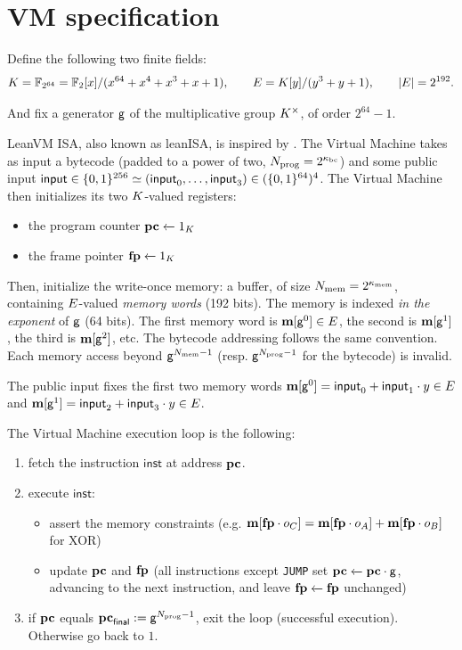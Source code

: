\section{VM specification}\label{sec:vm}

Define the following two finite fields:
\[
  K=\mathbb{F}_{2^{64}}=\mathbb{F}_2[x]/(x^{64}+x^4+x^3+x+1),
  \qquad
  E=K[y]/(y^3+y+1),
  \qquad |E|=2^{192}.
\]

And fix a generator $\mathsf{g}$ of the multiplicative group $K^{\times}$, of order $2^{64}-1$.

\vspace{5mm}

LeanVM ISA, also known as leanISA, is inspired by \cite{cairo}. The Virtual Machine takes as input a bytecode (padded to a power of two, $N_{\mathrm{prog}} = 2^{\kappa_{\mathrm{bc}}}$) and some public input $\textsf{input} \in \{0,1\}^{256} \simeq (\textsf{input}_0, \dots, \textsf{input}_3) \in (\{0,1\}^{64})^4$. The Virtual Machine then initializes its two $K$-valued registers:
\begin{itemize}
  \item the program counter $\mathbf{pc} \xleftarrow{} 1_K$
  \item the frame pointer $\mathbf{fp} \xleftarrow{} 1_K$
\end{itemize}

Then, initialize the write-once memory: a buffer, of size $N_{\mathrm{mem}} = 2^{\kappa_{\mathrm{mem}}}$, containing $E$-valued \textit{memory words} (192 bits). The memory is indexed \textit{in the exponent} of $\mathsf{g}$ (64 bits). The first memory word is $\mathbf{m}[\mathsf{g}^0] \in E$, the second is $\mathbf{m}[\mathsf{g}^1]$, the third is $\mathbf{m}[\mathsf{g}^2]$, etc. The bytecode addressing follows the same convention. Each memory access beyond $\mathsf{g}^{N_{\mathrm{mem}} - 1}$ (resp. $\mathsf{g}^{N_{\mathrm{prog}} - 1}$ for the bytecode) is invalid.

The public input fixes the first two memory words $\mathbf{m}[\mathsf{g}^0] = \textsf{input}_0 + \textsf{input}_1 \cdot y \in E$ and $\mathbf{m}[\mathsf{g}^1] = \textsf{input}_2 + \textsf{input}_3 \cdot y \in E$.

The Virtual Machine execution loop is the following:
\begin{enumerate}
  \item fetch the instruction $\mathsf{inst}$ at address $\mathbf{pc}$.
  \item execute $\mathsf{inst}$:
    \begin{itemize}
      \item assert the memory constraints (e.g. $\mathbf{m}[\mathbf{fp}\cdot o_C]=\mathbf{m}[\mathbf{fp}\cdot o_A]+\mathbf{m}[\mathbf{fp}\cdot o_B]$ for XOR)
      \item update $\mathbf{pc}$ and $\mathbf{fp}$ (all instructions except \texttt{JUMP} set $\mathbf{pc} \xleftarrow{} \mathbf{pc} \cdot \mathsf{g}$, advancing to the next instruction, and leave $\mathbf{fp} \xleftarrow{} \mathbf{fp}$ unchanged)
    \end{itemize}
  \item if $\mathbf{pc}$ equals $\mathbf{pc}_{\textsf{final}} := \mathsf{g}^{N_{\mathrm{prog}} - 1}$, exit the loop (successful execution). Otherwise go back to $1.$
\end{enumerate}

